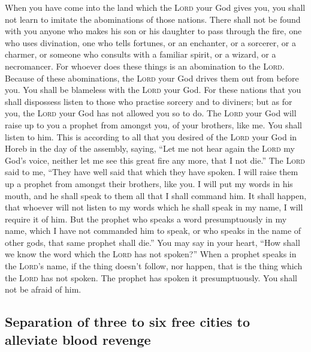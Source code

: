  When you have come into the land which the \textsc{Lord}
your God gives you, you shall not learn to imitate the abominations of
those nations.  There shall not be found with you anyone
who makes his son or his daughter to pass through the fire, one who uses
divination, one who tells fortunes, or an enchanter, or a sorcerer,
 or a charmer, or someone who consults with a familiar
spirit, or a wizard, or a necromancer.  For whoever does
these things is an abomination to the \textsc{Lord}. Because of these
abominations, the \textsc{Lord} your God drives them out from before
you.  You shall be blameless with the \textsc{Lord} your
God.  For these nations that you shall dispossess listen
to those who practise sorcery and to diviners; but as for you, the
\textsc{Lord} your God has not allowed you so to do.  The
\textsc{Lord} your God will raise up to you a prophet from amongst you,
of your brothers, like me. You shall listen to him.  This
is according to all that you desired of the \textsc{Lord} your God in
Horeb in the day of the assembly, saying, ``Let me not hear again the
\textsc{Lord} my God's voice, neither let me see this great fire any
more, that I not die.''  The \textsc{Lord} said to me,
``They have well said that which they have spoken.  I
will raise them up a prophet from amongst their brothers, like you. I
will put my words in his mouth, and he shall speak to them all that I
shall command him.  It shall happen, that whoever will
not listen to my words which he shall speak in my name, I will require
it of him.  But the prophet who speaks a word
presumptuously in my name, which I have not commanded him to speak, or
who speaks in the name of other gods, that same prophet shall die.''
 You may say in your heart, ``How shall we know the word
which the \textsc{Lord} has not spoken?''  When a prophet
speaks in the \textsc{Lord}'s name, if the thing doesn't follow, nor
happen, that is the thing which the \textsc{Lord} has not spoken. The
prophet has spoken it presumptuously. You shall not be afraid of him.

\hypertarget{separation-of-three-to-six-free-cities-to-alleviate-blood-revenge}{%
\subsection{Separation of three to six free cities to alleviate blood
revenge}\label{separation-of-three-to-six-free-cities-to-alleviate-blood-revenge}}

